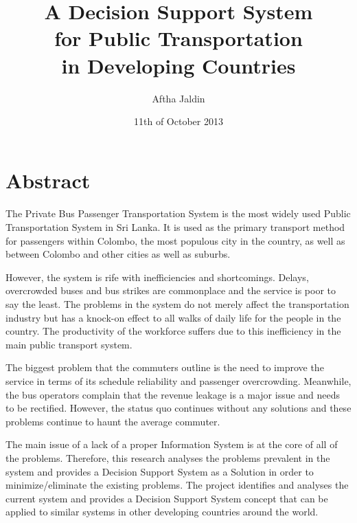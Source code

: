\documentclass[12pt, oneside]{report}
\title{
A Decision Support System
\\ for Public Transportation
\\ in Developing Countries
}
\author{Aftha Jaldin}
\date{11th of October 2013}
\begin{document}
\maketitle

\tableofcontents
\newpage
{}

\listoffigures
\newpage

\listoftables
\newpage



\section*{Abstract}

\paragraph{ } The Private Bus Passenger Transportation System is the most widely used Public Transportation System in Sri Lanka. It is used as the primary transport method for passengers within Colombo, the most populous city in the country, as well as between Colombo and other cities as well as suburbs.

However, the system is rife with inefficiencies and shortcomings. Delays, overcrowded buses and bus strikes are commonplace and the service is poor to say the least. The problems in the system do not merely affect the transportation industry but has a knock-on effect to all walks of daily life for the people in the country. The productivity of the workforce suffers due to this inefficiency in the main public transport system.

The biggest problem that the commuters outline is the need to improve the service in terms of its schedule reliability and passenger overcrowding. Meanwhile, the bus operators complain that the revenue leakage is a major issue and needs to be rectified. However, the status quo continues without any solutions and these problems continue to haunt the average commuter.

The main issue of a lack of a proper Information System is at the core of all of the problems. Therefore, this research analyses the problems prevalent in the system and provides a Decision Support System as a Solution in order to minimize/eliminate the existing problems. The project identifies and analyses the current system and provides a Decision Support System concept that can be applied to similar systems in other developing countries around the world.
\end{document}
